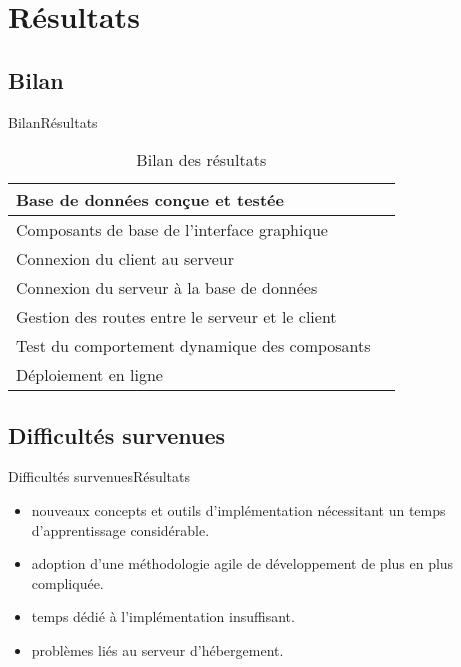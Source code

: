 \documentclass[usenames,dvipsnames]{beamer}
\newcommand{\cmark}{\ding{51}}
\newcommand{\xmark}{\ding{55}}
\begin{document}
\section{Résultats}
\subsection{Bilan}
\begin{frame}{Bilan}{Résultats}
\begin{table}[!ht]
  \centering
  \begin{tabular}{|l|c|}
  \hline
  Base de données conçue et testée & \cmark\\
  \hline
  Composants de base de l'interface graphique & \cmark\\
  \hline
  Connexion du client au serveur & \cmark\\
  \hline
  Connexion du serveur à la base de données & \cmark\\
  \hline
  Gestion des routes entre le serveur et le client & \xmark\\
  \hline
  Test du comportement dynamique des composants & \xmark\\
  \hline
  Déploiement en ligne & \xmark\\
  \hline
  \end{tabular}
  \caption{Bilan des résultats}
\end{table}
\end{frame}
\subsection{Difficultés survenues}
\begin{frame}{Difficultés survenues}{Résultats}
  \begin{itemize}
    \item nouveaux concepts et outils d'implémentation nécessitant un temps d'apprentissage considérable.
    \item adoption d'une méthodologie agile de développement de plus en plus compliquée.
    \item temps dédié à l'implémentation insuffisant.
    \item problèmes liés au serveur d'hébergement.
  \end{itemize}
\end{frame}
\end{document}
